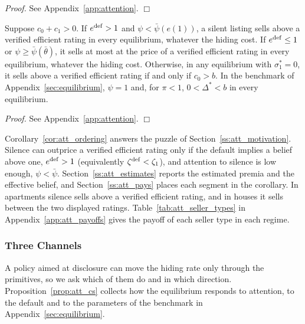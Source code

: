 \noindent\textit{Proof.} See Appendix~\ref{app:attention}. $\Box$

\begin{corollary}
\label{cor:att_ordering}
Suppose $c_0+c_1>0$. If $e^{\rm def}>1$ and $\psi<\bar\psi(e(1))$, a silent listing sells above a verified efficient rating in every equilibrium, whatever the hiding cost. If $e^{\rm def}\le1$ or $\psi\ge\bar\psi(\bar\theta)$, it sells at most at the price of a verified efficient rating in every equilibrium, whatever the hiding cost. Otherwise, in any equilibrium with $\sigma_1^*=0$, it sells above a verified efficient rating if and only if $c_0>b$. In the benchmark of Appendix~\ref{sec:equilibrium}, $\psi=1$ and, for $\pi<1$, $0<\Delta^*<b$ in every equilibrium.
\end{corollary}

\noindent\textit{Proof.} See Appendix~\ref{app:attention}. $\Box$

Corollary~\ref{cor:att_ordering} answers the puzzle of Section~\ref{ss:att_motivation}. Silence can outprice a verified efficient rating only if the default implies a belief above one, $e^{\rm def}>1$ (equivalently $\zeta^{\rm def}<\zeta_1$), and attention to silence is low enough, $\psi<\bar\psi$. Section~\ref{ss:att_estimates} reports the estimated premia and the effective belief, and Section~\ref{ss:att_pays} places each segment in the corollary. In apartments silence sells above a verified efficient rating, and in houses it sells between the two displayed ratings. Table~\ref{tab:att_seller_types} in Appendix~\ref{app:att_payoffs} gives the payoff of each seller type in each regime.

\subsubsection{Three Channels}
\label{ss:att_channels}

A policy aimed at disclosure can move the hiding rate only through the primitives, so we ask which of them do and in which direction. Proposition~\ref{prop:att_cs} collects how the equilibrium responds to attention, to the default and to the parameters of the benchmark in Appendix~\ref{sec:equilibrium}.


